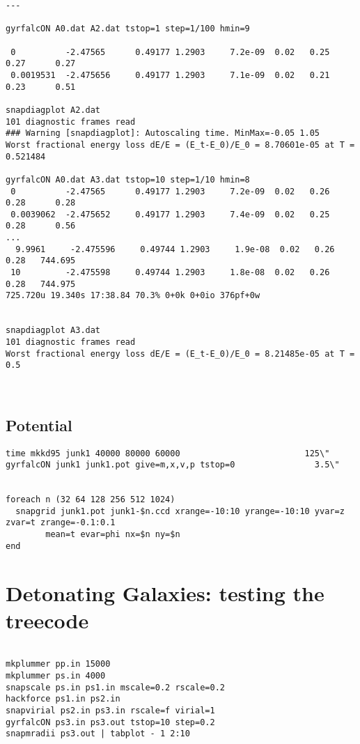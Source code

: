 {\begin{verbatim}
---

gyrfalcON A0.dat A2.dat tstop=1 step=1/100 hmin=9

 0          -2.47565      0.49177 1.2903     7.2e-09  0.02   0.25       0.27      0.27
 0.0019531  -2.475656     0.49177 1.2903     7.1e-09  0.02   0.21       0.23      0.51

snapdiagplot A2.dat
101 diagnostic frames read
### Warning [snapdiagplot]: Autoscaling time. MinMax=-0.05 1.05
Worst fractional energy loss dE/E = (E_t-E_0)/E_0 = 8.70601e-05 at T = 0.521484

gyrfalcON A0.dat A3.dat tstop=10 step=1/10 hmin=8
 0          -2.47565      0.49177 1.2903     7.2e-09  0.02   0.26       0.28      0.28
 0.0039062  -2.475652     0.49177 1.2903     7.4e-09  0.02   0.25       0.28      0.56
...
  9.9961     -2.475596     0.49744 1.2903     1.9e-08  0.02   0.26       0.28   744.695
 10         -2.475598     0.49744 1.2903     1.8e-08  0.02   0.26       0.28   744.975
725.720u 19.340s 17:38.84 70.3% 0+0k 0+0io 376pf+0w


snapdiagplot A3.dat
101 diagnostic frames read
Worst fractional energy loss dE/E = (E_t-E_0)/E_0 = 8.21485e-05 at T = 0.5



\end{verbatim}\normalsize

\subsection{Potential}

\footnotesize\begin{verbatim}
time mkkd95 junk1 40000 80000 60000                         125\"
gyrfalcON junk1 junk1.pot give=m,x,v,p tstop=0                3.5\"


foreach n (32 64 128 256 512 1024)
  snapgrid junk1.pot junk1-$n.ccd xrange=-10:10 yrange=-10:10 yvar=z zvar=t zrange=-0.1:0.1 
        mean=t evar=phi nx=$n ny=$n
end

\end{verbatim}\normalsize  %

\section{Detonating Galaxies: testing the treecode}

\footnotesize\begin{verbatim}

mkplummer pp.in 15000
mkplummer ps.in 4000
snapscale ps.in ps1.in mscale=0.2 rscale=0.2
hackforce ps1.in ps2.in
snapvirial ps2.in ps3.in rscale=f virial=1
gyrfalcON ps3.in ps3.out tstop=10 step=0.2
snapmradii ps3.out | tabplot - 1 2:10


\end{verbatim}}
